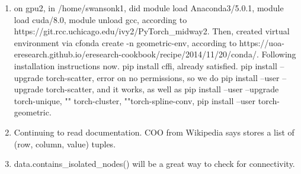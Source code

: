 \documentclass[12pt,reqno]{amsart}
\numberwithin{equation}{section}
\begin{document}
\begin{enumerate}
\item on gpu2, in /home/swansonk1, did module load Anaconda3/5.0.1, module load cuda/8.0, module unload gcc, according to https://git.rcc.uchicago.edu/ivy2/PyTorch\_midway2.  Then, created virtual environment via cfonda create -n geometric-env, according to https://uoa-eresearch.github.io/eresearch-cookbook/recipe/2014/11/20/conda/.  Following installation instructions now.  pip install cffi, already satisfied.  pip install --upgrade torch-scatter, error on no permissions, so we do pip install --user --upgrade torch-scatter, and it works, as well as pip install --user --upgrade torch-unique, "" torch-cluster, ""torch-spline-conv, pip install --user torch-geometric.  
\item Continuing to read documentation.  COO from Wikipedia says stores a list of (row, column, value) tuples.  
\item data.contains\_isolated\_nodes() will be a great way to check for connectivity.    
\end{enumerate}
\end{document}
